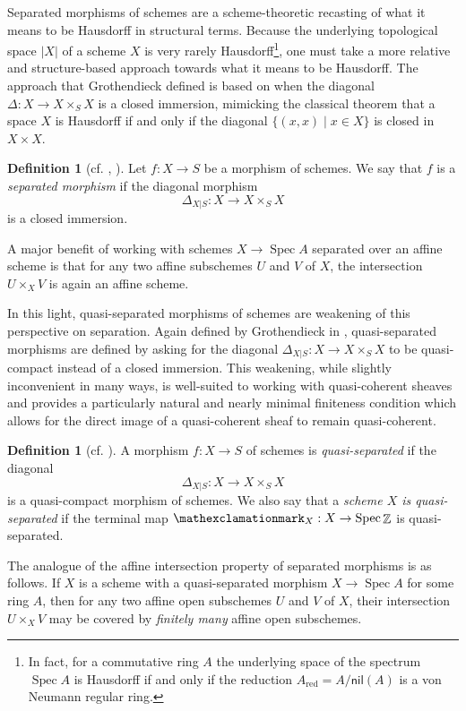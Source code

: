 \documentclass{amsart}
\theoremstyle{definition}
\newtheorem{definition}[equation]{Definition}
\newcommand{\bang}{\mathexclamationmark}
\DeclareMathOperator{\Z}{\mathbb{Z}}
\DeclareMathOperator{\Spec}{Spec}
\DeclareMathOperator{\red}{red}
\numberwithin{equation}{subsection}
\begin{document}
Separated morphisms of schemes are a scheme-theoretic recasting of what it means to be Hausdorff in structural terms. Because the underlying topological space $\lvert X \rvert$ of a scheme $X$ is very rarely Hausdorff\footnote{In fact, for a commutative ring $A$ the underlying space of the spectrum $\Spec A$ is Hausdorff if and only if the reduction $A_{\red} = A/\mathsf{nil}(A)$ is a von Neumann regular ring.}, one must take a more relative and structure-based approach towards what it means to be Hausdorff. The approach that Grothendieck defined is based on when the diagonal $\Delta:X \to X\times_S X$ is a closed immersion, mimicking the classical theorem that a space $X$ is Hausdorff if and only if the diagonal $\lbrace (x,x) \; | \; x \in X \rbrace$ is closed in $X \times X$.
\begin{definition}[{cf. \cite[D{\'e}finition 5.4.1]{EGA1}, \cite[Definition II.4.1]{Hartshorne}}]\label{Defn: Separated morphism}
Let $f:X \to S$ be a morphism of schemes. We say that $f$ is a \emph{separated morphism} if the diagonal morphism
\[
\Delta_{X\vert S}:X\to X \times_S X
\]
is a closed immersion.
\end{definition}
A major benefit of working with schemes $X \to \Spec A$ separated over an affine scheme is that for any two affine subschemes $U$ and $V$ of $X$, the intersection $U \times_X V$ is again an affine scheme.

In this light, quasi-separated morphisms of schemes are weakening of this perspective on separation. Again defined by Grothendieck in , quasi-separated morphisms are defined by asking for the diagonal $\Delta_{X|S}:X \to X \times_S X$ to be quasi-compact instead of a closed immersion. This weakening, while slightly inconvenient in many ways, is well-suited to working with quasi-coherent sheaves and provides a particularly natural and nearly minimal finiteness condition which allows for the direct image of a quasi-coherent sheaf to remain quasi-coherent.
\begin{definition}[{cf. \cite[D{\'e}finition 1.2.1]{EGA41}}]\label{Defn: qsMorphism}
A morphism $f:X \to S$ of schemes is \emph{quasi-separated} if the diagonal
\[
\Delta_{X\vert S}:X \to X \times_S X
\]
is a quasi-compact morphism of schemes. We also say that a \emph{scheme $X$ is quasi-separated} if the terminal map $\bang_X:X \to \Spec \Z$ is quasi-separated.
\end{definition}
The analogue of the affine intersection property of separated morphisms is as follows. If $X$ is a scheme with a quasi-separated morphism $X \to \Spec A$ for some ring $A$, then for any two affine open subschemes $U$ and $V$ of $X$, their intersection $U \times_X V$ may be covered by \emph{finitely many} affine open subschemes.
\end{document}
